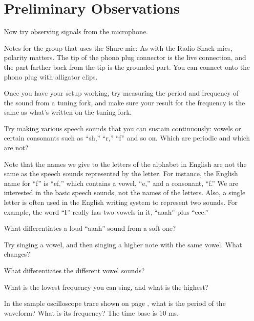\section{Preliminary Observations}

Now try observing signals from the microphone.

Notes for the group that uses the Shure mic: As with the Radio Shack
mics, polarity matters. The tip of the phono plug connector is the
live connection, and the part farther back from the tip is the
grounded part. You can connect onto the phono plug with alligator
clips.

Once you have your setup working, try measuring the period
and frequency of the sound from a tuning fork, and make sure
your result for the frequency is the same as what's
written on the tuning fork.

\observations


Try making various speech sounds that you can sustain
continuously: vowels or certain consonants such as ``sh,''
``r,'' ``f'' and so on. Which are periodic and which are not?

Note that the names we give to the letters of the alphabet
in English are not the same as the speech sounds represented
by the letter. For instance, the English name for ``f'' is
``ef,'' which contains a vowel, ``e,'' and a consonant,
``f.'' We are interested in the basic speech sounds, not the
names of the letters. Also, a single letter is often used in
the English writing system to represent two sounds. For
example, the word ``I'' really has two vowels in it,
``aaah'' plus ``eee.''


What differentiates a loud ``aaah'' sound from a soft one?


Try singing a vowel, and then singing a higher note with the
same vowel. What changes?


What differentiates the different vowel sounds?


What is the lowest frequency you can sing, and what is the highest?

\prelab

\prelabquestion  In the sample oscilloscope trace shown on
page \pageref{fig:em-osc-waveform}, what is
the period of the waveform? What is its frequency? The time base is
10 ms.

